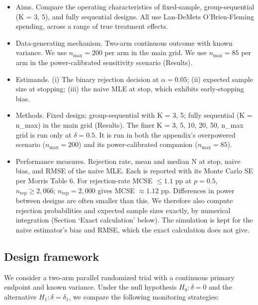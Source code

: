 \documentclass[
  11pt,
]{article}
\providecommand{\tightlist}{%
  \setlength{\itemsep}{0pt}\setlength{\parskip}{0pt}}
\begin{document}
\begin{itemize}
\tightlist
\item
  Aims. Compare the operating characteristics of fixed-sample,
  group-sequential (K = 3, 5), and fully sequential designs. All
  use Lan-DeMets O'Brien-Fleming spending, across a range of true
  treatment effects.
\item
  Data-generating mechanism. Two-arm continuous outcome with
  known variance. We use \(n_{\max} = 200\) per arm in the main
  grid. We use \(n_{\max} = 85\) per arm in the power-calibrated
  sensitivity scenario (Results).
\item
  Estimands. (i) The binary rejection decision at
  \(\alpha = 0.05\); (ii) expected sample size at stopping; (iii) the
  naive MLE at stop, which exhibits early-stopping bias.
\item
  Methods. Fixed design; group-sequential with K = 3, 5; fully
  sequential (K = n\_max) in the main grid (Results). The finer
  K = 3, 5, 10, 20, 50, n\_max grid is run only at \(\delta = 0.5\).
  It is run in both the appendix's overpowered scenario
  (\(n_{\max} = 200\)) and its power-calibrated companion
  (\(n_{\max} = 85\)).
\item
  Performance measures. Rejection rate, mean and median N at
  stop, naive bias, and RMSE of the naive MLE. Each is reported
  with its Monte Carlo SE per Morris Table 6. For rejection-rate
  MCSE \(\leq 1.1\) pp at \(p = 0.5\), \(n_{\mathrm{rep}} \geq 2{,}066\);
  \(n_{\mathrm{rep}} = 2{,}000\) gives MCSE \(\approx 1.12\) pp.
  Differences in power between designs are often smaller than
  this. We therefore also compute rejection probabilities and
  expected sample sizes exactly, by numerical integration
  (Section `Exact calculation' below). The simulation is kept
  for the naive estimator's bias and RMSE, which the exact
  calculation does not give.
\end{itemize}

\subsection{Design framework}\label{design-framework}

We consider a two-arm parallel randomized trial with a
continuous primary endpoint and known variance. Under
the null hypothesis \(H_0: \delta = 0\) and the
alternative \(H_1: \delta = \delta_1\), we compare the
following monitoring strategies:
\end{document}

